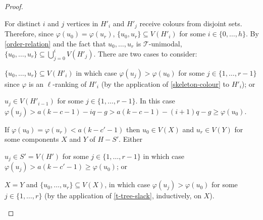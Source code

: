 \documentclass[kpfonts]{patmorin}
\theoremstyle{named}
\begin{document}
\begin{proof}
\begin{compactenum}
        For distinct $i$ and $j$ vertices in $H'_i$ and $H'_j$ receive colours from disjoint sets.  Therefore, since $\varphi(u_0)=\varphi(u_r)$,  $\{u_0,u_r\}\subseteq V(H'_i)$ for some $i\in\{0,\ldots,h\}$.  By \cref{order-relation} and the fact that $u_0,\ldots,u_r$ is $\mathcal{T}$-unimodal, $\{u_0,\ldots,u_{r}\}\subseteq \bigcup_{j=0}^{i} V(H'_j)$.  There are two cases to consider:
        \begin{compactenum}
           \item $\{u_0,\ldots,u_{r}\}\subseteq V(H'_i)$ in which case $\varphi(u_j)>\varphi(u_0)$ for some $j\in\{1,\ldots,r-1\}$ since $\varphi$ is an $\ell$-ranking of $H'_i$ (by the application of \cref{skeleton-colour} to $H'_i$); or
           \item $u_j\in V(H'_{i-1})$ for some $j\in\{1,\ldots,r-1\}$.  In this case $\varphi(u_j)>a(k-c-1)-iq-g > a(k-c-1)-(i+1)q-g \ge \varphi(u_0)$.
       \end{compactenum}
       \item If $\varphi(u_0)=\varphi(u_r) < a(k-c'-1)$ then $u_0\in V(X)$ and $u_r\in V(Y)$ for some components $X$ and $Y$ of $H-S'$.  Either
       \begin{compactenum}
            \item $u_j\in S'=V(H')$ for some $j\in\{1,\ldots,r-1\}$ in which case $\varphi(u_j)>a(k-c'-1)\ge\varphi(u_0)$; or
            \item $X=Y$ and $\{u_0,\ldots,u_r\}\subseteq V(X)$, in which case $\varphi(u_j)>\varphi(u_0)$ for some $j\in\{1,\ldots,r\}$ (by the application of \cref{t-tree-slack}, inductively, on $X$). \qedhere
        \end{compactenum}
    \end{compactenum}
\end{proof}
\end{document}
